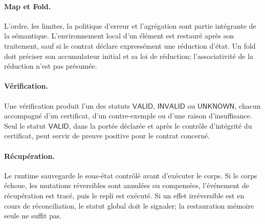 \documentclass[11pt,a4paper]{article}
\theoremstyle{definition}
\theoremstyle{plain}
\theoremstyle{remark}
\begin{document}
\paragraph{Map et Fold.} L'ordre, les limites, la politique d'erreur et l'agrégation sont partie intégrante de la sémantique. L'environnement local d'un élément est restauré après son traitement, sauf si le contrat déclare expressément une réduction d'état. Un fold doit préciser son accumulateur initial et sa loi de réduction; l'associativité de la réduction n'est pas présumée.

\paragraph{Vérification.} Une vérification produit l'un des statuts $\mathsf{VALID}$, $\mathsf{INVALID}$ ou $\mathsf{UNKNOWN}$, chacun accompagné d'un certificat, d'un contre-exemple ou d'une raison d'insuffisance. Seul le statut $\mathsf{VALID}$, dans la portée déclarée et après le contrôle d'intégrité du certificat, peut servir de preuve positive pour le contrat concerné.

\paragraph{Récupération.} Le runtime sauvegarde le sous-état contrôlé avant d'exécuter le corps. Si le corps échoue, les mutations réversibles sont annulées ou compensées, l'événement de récupération est tracé, puis le repli est exécuté. Si un effet irréversible est en cours de réconciliation, le statut global doit le signaler; la restauration mémoire seule ne suffit pas.
\end{document}
